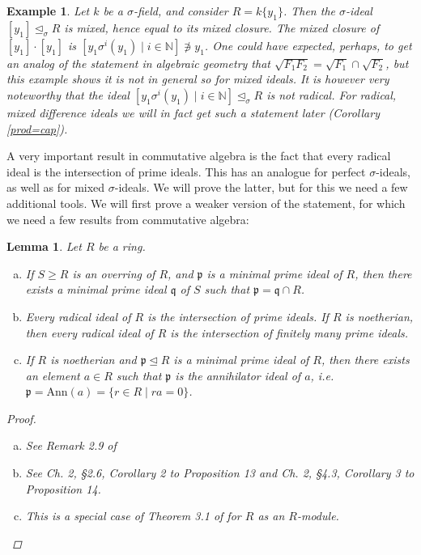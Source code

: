 \documentclass{article}
\def\N{\mathbb{N}}
\def\p{\mathfrak{p}}
\def\q{\mathfrak{q}}
\def\s{\sigma}
\def\si{\unlhd_{\sigma}}
\newenvironment{bew}{\begin{proof}[Proof]}{\end{proof}}
\theoremstyle{plain}
\newtheorem{ex}[Satz]{Example}
\newtheorem{lem}[Satz]{Lemma}
\theoremstyle{definition}
\begin{document}
\begin{ex} %
Let $k$ be a $\s$-field, and consider $R = k\{y_1\}$. Then the $\s$-ideal $[y_1] \si R$ is mixed, hence equal to its mixed closure.
The mixed closure of $[y_1] \cdot [y_1]$ is $[ y_1 \s^i(y_1) \mid i \in \N ] \not \ni y_1$.
One could have expected, perhaps, to get an analog of the statement in algebraic geometry that $\sqrt{F_1  F_2 } = \sqrt{F_1} \cap \sqrt{F_2}$, but this example shows it is not in general so for mixed ideals.
It is however very noteworthy that the ideal $[ y_1 \s^i(y_1) \mid i \in \N ] \si R$ is not radical. For radical, mixed difference ideals we will in fact get such a statement later (Corollary \ref{prod=cap}).
\end{ex}

A very important result in commutative algebra is the fact that every radical ideal is the intersection of prime ideals. This has an analogue for perfect $\s$-ideals, as well as for mixed $\s$-ideals. 
We will prove the latter, but for this we need a few additional tools. We will first prove a weaker version of the statement, for which we need a few results from commutative algebra:

\begin{lem}\label{commalg}
Let $R$ be a ring. 
\begin{enumerate}[(a)]
\item If $S \geq R$ is an overring of $R$, and $\p$ is a minimal prime ideal of $R$, then there exists a minimal prime ideal $\q$ of $S$ such that $\p = \q \cap R$.
\item Every radical ideal of $R$ is the intersection of prime ideals. If $R$ is noetherian, then every radical ideal of $R$ is the intersection of finitely many prime ideals.
\item If $R$ is noetherian and $\p \unlhd R$ is a minimal prime ideal of $R$, then there exists an element $a \in R$ such that $\p$ is the annihilator ideal of $a$, i.e. $\p = \text{Ann}(a) = \{ r \in R \mid ra = 0 \}$.
\end{enumerate}
\begin{bew} $~$
\begin{enumerate}[(a)]
\item See Remark 2.9 of \cite{hrushovski}
\item See \cite{bourbaki} Ch. 2, \S 2.6, Corollary 2 to Proposition 13 and Ch. 2, \S 4.3, Corollary 3 to Proposition 14.
\item This is a special case of Theorem 3.1 of \cite{eisenbud} for $R$ as an $R$-module.
\end{enumerate}
\end{bew}
\end{lem}
\end{document}
